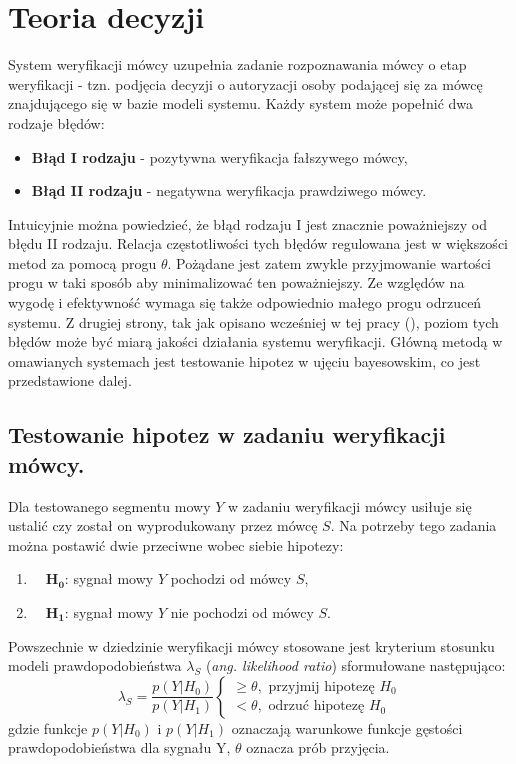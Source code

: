 \section{Teoria decyzji}

System weryfikacji mówcy uzupełnia zadanie rozpoznawania mówcy o etap weryfikacji - tzn. podjęcia decyzji o autoryzacji osoby podającej się za mówcę znajdującego się w bazie modeli systemu. Każdy system może popełnić dwa rodzaje błędów:
\begin{itemize}
  \item{\textbf{Błąd I rodzaju}} - pozytywna weryfikacja fałszywego mówcy,
  \item{\textbf{Błąd II rodzaju}} - negatywna weryfikacja prawdziwego mówcy.
\end{itemize}
Intuicyjnie można powiedzieć, że błąd rodzaju I jest znacznie poważniejszy od błędu II rodzaju. Relacja częstotliwości tych błędów regulowana jest w większości metod za pomocą progu $\theta$. Pożądane jest zatem zwykle przyjmowanie wartości progu w taki sposób aby minimalizować ten poważniejszy. Ze względów na wygodę i efektywność wymaga się także odpowiednio małego progu odrzuceń systemu. Z drugiej strony, tak jak opisano wcześniej w tej pracy (\cite{err}), poziom tych błędów może być miarą jakości działania systemu weryfikacji. Główną metodą w omawianych systemach jest testowanie hipotez w ujęciu bayesowskim, co jest przedstawione dalej.  

\subsection{Testowanie hipotez w zadaniu weryfikacji mówcy.}

Dla testowanego segmentu mowy $Y$ w zadaniu weryfikacji mówcy usiłuje się ustalić czy został on wyprodukowany przez mówcę $S$. Na potrzeby tego zadania można postawić dwie przeciwne wobec siebie hipotezy:
\begin{enumerate}
  \item{$\quad\bm{H_0}$}: sygnał mowy $Y$ pochodzi od mówcy $S$,
  \item{$\quad\bm{H_1}$}: sygnał mowy $Y$ nie pochodzi od mówcy $S$.
\end{enumerate}
Powszechnie w dziedzinie weryfikacji mówcy stosowane jest kryterium stosunku modeli prawdopodobieństwa $\lambda_S$ (\textit{ang. likelihood ratio}) sformułowane następująco:
\begin{equation}
  \label{likratio}
  \lambda_S = \frac{p(Y|H_0)}{p(Y|H_1)}
  \begin{cases}
    \ge \theta, \textrm{ przyjmij hipotezę } H_0 \\
    < \theta, \textrm{ odrzuć hipotezę } H_0
  \end{cases}
\end{equation}
gdzie funkcje $p(Y|H_0)$ i $p(Y|H_1)$ oznaczają warunkowe funkcje gęstości prawdopodobieństwa dla sygnału Y, $\theta$ oznacza prób przyjęcia. 

